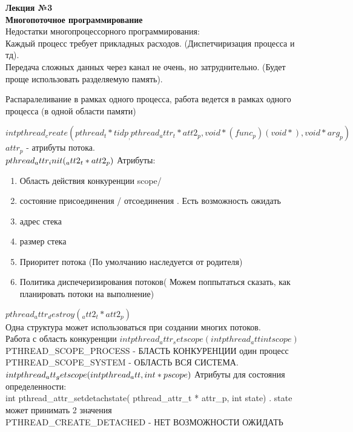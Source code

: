 \LARGE{ \textbf {Лекция №3}}\\
\Large{ \textbf {Многопоточное программирование}}\\

Недостатки многопроцессорного программирования:\\
Каждый процесс требует прикладных расходов. (Диспетчиризация процесса и тд).\\
Передача сложных данных через канал не очень, но затруднительно. (Будет проще использовать разделяемую память).

Распаралеливание в рамках одного процесса, работа ведется в рамках одного процесса (в одной области памяти)


$int pthread_create( pthread_t *tidp_, pthread_attr_t *att2_p, void*(func_p)(void *), void* arg_p)$\\
$attr_p$ - атрибуты потока.\\
$pthread_attr_init(_att2_t * att2_p)\\$
Атрибуты: \\
\begin{enumerate}
  \item Область действия конкуренции scope/
  \item состояние присоединения / отсоединения . Есть возможность ожидать
  \item адрес стека
  \item размер стека
  \item Приоритет потока (По умолчанию наследуется от родителя)
  \item Политика диспечеризирования потоков( Можем поппытаться сказать, как планировать потоки на выполнение)
\end{enumerate}
$pthread_attr_destroy(_att2_t * att2_p)$ \\
Одна структура может использоваться при создании многих потоков.\\
Работа с область конкуренции
$int pthread_attr_setscope(int pthread_att int scope) $\\
PTHREAD_SCOPE_PROCESS - БЛАСТЬ КОНКУРЕНЦИИ  один процесс \\
PTHREAD_SCOPE_SYSTEM - ОБЛАСТЬ ВСЯ СИСТЕМА.\\
$int pthread_att_getscope(int pthread_att ,int * pscope)\\$
Атрибуты для состояния определенности:\\
int pthread_attr_setdetachstate( pthread_attr_t * attr_p, int state) . state может принимать 2 значения\\
  PTHREAD_CREATE_DETACHED  - НЕТ ВОЗМОЖНОСТИ ОЖИДАТЬ\\
